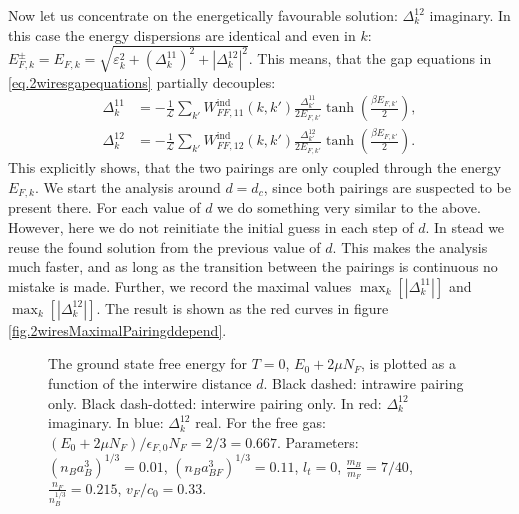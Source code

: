 Now let us concentrate on the energetically favourable solution: $\Delta^{12}_k$ imaginary. In this case the energy dispersions are identical and even in $k$: $E^{\pm}_{F,k} = E_{F,k} = \sqrt{\varepsilon_k^2 + (\Delta^{11}_k)^2 + |\Delta^{12}_k|^2}$. This means, that the gap equations in \eqref{eq.2wiresgapequations} partially decouples: 
\begin{align}
\Delta^{11}_k &= -\frac{1}{\mathcal{L}}\sum_{k'} W^\text{ind}_{FF,11}(k, k')\frac{\Delta^{11}_{k'}}{2E_{F,k'}}\tanh\left(\frac{\beta E_{F,k'}}{2}\right), \nonumber \\
\Delta^{12}_k &= -\frac{1}{\mathcal{L}}\sum_{k'} W^\text{ind}_{FF,12}(k, k')\frac{\Delta^{12}_{k'}}{2E_{F,k'}}\tanh\left(\frac{\beta E_{F,k'}}{2}\right).
\label{eq.2wiresgapequationsDelta12imaginary}
\end{align} 
This explicitly shows, that the two pairings are only coupled through the energy $E_{F,k}$. We start the analysis around $d = d_c$, since both pairings are suspected to be present there. For each value of $d$ we do something very similar to the above. However, here we do not reinitiate the initial guess in each step of $d$. In stead we reuse the found solution from the previous value of $d$. This makes the analysis much faster, and as long as the transition between the pairings is continuous no mistake is made. Further, we record the maximal values $\max_k\left[\left|\Delta^{11}_k\right|\right]$ and $\max_k\left[\left|\Delta^{12}_k\right|\right]$. The result is shown as the red curves in figure \ref{fig.2wiresMaximalPairingddepend}.

\begin{figure} 
\begin{center}  
  
\caption{The ground state free energy for $T = 0$, $E_0 + 2\mu N_F$, is plotted as a function of the interwire distance $d$. Black dashed: intrawire pairing only. Black dash-dotted: interwire pairing only. In red: $\Delta^{12}_k$ imaginary. In blue: $\Delta^{12}_k$ real. For the free gas: $(E_0 + 2\mu N_F)/\epsilon_{F,0}N_F = 2/3 = 0.667$. Parameters: $(n_Ba_B^3)^{1/3} = 0.01$, $(n_Ba_{BF}^3)^{1/3} = 0.11$, $l_t = 0$, $\frac{m_B}{m_F} = 7/40$, $\frac{n_F}{n_B^{1/3}} = 0.215$, $v_F/c_0 = 0.33$. }  
\label{fig.2wiresE0ddepend}  
\end{center}
\end{figure}

